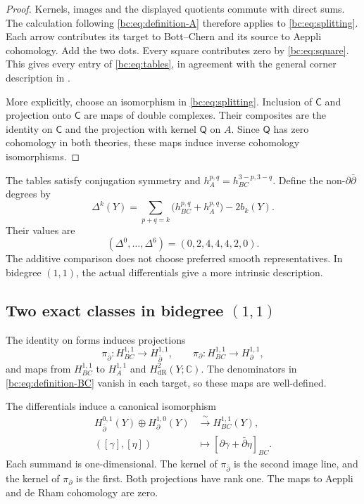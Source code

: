 \begin{proof}
Kernels, images and the displayed quotients commute with direct
sums. The calculation following
\eqref{bc:eq:definition-A} therefore applies to
\eqref{bc:eq:splitting}. Each arrow contributes its target to
Bott--Chern and its source to Aeppli cohomology. Add the two
dots. Every square contributes zero by
\eqref{bc:eq:square}. This gives every entry of
\eqref{bc:eq:tables}, in agreement with the general corner
description in \cite[Lemma~8]{StelzigDouble}.

More explicitly, choose an isomorphism in
\eqref{bc:eq:splitting}. Inclusion of $\mathsf C$ and projection
onto $\mathsf C$ are maps of double complexes. Their composites
are the identity on $\mathsf C$ and the projection with kernel
$\mathsf Q$ on $A$. Since $\mathsf Q$ has zero cohomology in
both theories, these maps induce inverse cohomology isomorphisms.
\end{proof}

The tables satisfy conjugation symmetry and
$h_A^{p,q}=h_{BC}^{3-p,3-q}$. Define the non-$\partial\bar\partial$
degrees by
\[
 \Delta^k(Y)=\sum_{p+q=k}\bigl(h_{BC}^{p,q}+h_A^{p,q}\bigr)-2b_k(Y).
\]
Their values are
\begin{equation}\label{bc:eq:degrees}
       (\Delta^0,\ldots,\Delta^6)=(0,2,4,4,4,2,0).
\end{equation}
The additive comparison does not choose preferred smooth
representatives. In bidegree $(1,1)$, the actual differentials
give a more intrinsic description.

\subsection{Two exact classes in bidegree \texorpdfstring{$(1,1)$}{(1,1)}}

The identity on forms induces projections
\[
 \pi_{\bar\partial}:H_{BC}^{1,1}\longrightarrow H_{\bar\partial}^{1,1},
 \qquad
 \pi_\partial:H_{BC}^{1,1}\longrightarrow H_\partial^{1,1},
\]
and maps from $H_{BC}^{1,1}$ to $H_A^{1,1}$ and
$H_{\mathrm{dR}}^2(Y;\mathbb C)$.
The denominators in \eqref{bc:eq:definition-BC} vanish in each
target, so these maps are well-defined.

\begin{proposition}\label{bc:prop:two-lines}
The differentials induce a canonical isomorphism
\begin{equation}\label{bc:eq:two-lines}
 \begin{aligned}
 H_{\bar\partial}^{0,1}(Y)\oplus H_\partial^{1,0}(Y)
       &\xrightarrow{\ \sim\ }H_{BC}^{1,1}(Y),\\
 ([\gamma],[\eta])&\longmapsto
                       [\partial\gamma+\bar\partial\eta]_{BC}.
 \end{aligned}
\end{equation}
Each summand is one-dimensional.
The kernel of $\pi_{\bar\partial}$ is the second image line,
and the kernel of $\pi_\partial$ is the first.
Both projections have rank one. The maps to Aeppli and
de Rham cohomology are zero.
\end{proposition}

